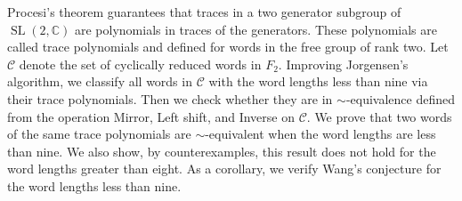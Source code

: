 \documentclass[12pt,reqno,letter,oneside,openright]{book}
\newcommand{\cw}{\mathcal{C}}
\newcommand{\ssl}{\operatorname{SL}(2,\mathbb{C})}
\numberwithin{equation}{chapter}
\theoremstyle{definition}
\begin{document}




\makefrontcover

\makeapproval

\makeenglishapproval

\singlespacing





 \setcounter{page}{1}

\begin{EnglishAbstract}
\hspace{\parindent}
Procesi's theorem guarantees that traces in a two generator subgroup of $\ssl$ are polynomials in traces of the generators. These polynomials are called trace polynomials and defined for words in the free group of rank two. Let $\cw$ denote the set of cyclically reduced words in $F_2$. 
Improving Jorgensen's algorithm, we classify all words in $\cw$ with the word lengths less than nine via their trace polynomials. Then we check whether they are in $\sim$-equivalence defined from the operation Mirror, Left shift, and Inverse on $\cw$.
We prove that two words of the same trace polynomials are $\sim$-equivalent when the word lengths are less than nine.
We also show, by counterexamples, this result does not hold for the word lengths greater than eight. As a corollary, we verify Wang's conjecture for the word lengths less than nine.
\end{EnglishAbstract}
\end{document}
